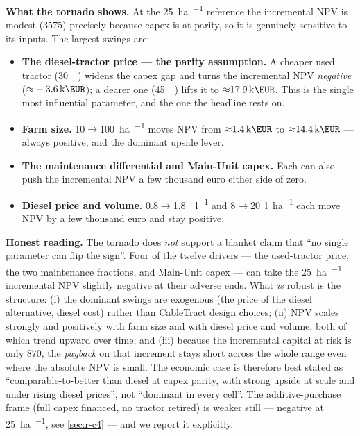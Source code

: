 \documentclass[11pt,a4paper]{article}
\begin{document}
\textbf{What the tornado shows.} At the \SI{25}{\hectare\per\year} reference the incremental NPV is modest (\SI{+3575}{\EUR}) precisely because capex is at parity, so it is genuinely sensitive to its inputs. The largest swings are:
\begin{itemize}[leftmargin=1.6em,itemsep=0.15em]
    \item \textbf{The diesel-tractor price --- the parity assumption.} A cheaper used tractor (\SI{30}{\kilo\EUR}) widens the capex gap and turns the incremental NPV \emph{negative} (${\approx}\SI{-3.6}{\kilo\EUR}$); a dearer one (\SI{45}{\kilo\EUR}) lifts it to ${\approx}\SI{+17.9}{\kilo\EUR}$. This is the single most influential parameter, and the one the headline rests on.
    \item \textbf{Farm size.} 10$\to$\SI{100}{\hectare\per\year} moves NPV from ${\approx}\SI{+1.4}{\kilo\EUR}$ to ${\approx}\SI{+14.4}{\kilo\EUR}$ --- always positive, and the dominant upside lever.
    \item \textbf{The maintenance differential and Main-Unit capex.} Each can also push the incremental NPV a few thousand euro either side of zero.
    \item \textbf{Diesel price and volume.} 0.8$\to$\SI{1.8}{\EUR\per\litre} and 8$\to$\SI{20}{\litre\per\hectare} each move NPV by a few thousand euro and stay positive.
\end{itemize}

\textbf{Honest reading.} The tornado does \emph{not} support a blanket claim that ``no single parameter can flip the sign''. Four of the twelve drivers --- the used-tractor price, the two maintenance fractions, and Main-Unit capex --- can take the \SI{25}{\hectare\per\year} incremental NPV slightly negative at their adverse ends. What \emph{is} robust is the structure: (i) the dominant swings are exogenous (the price of the diesel alternative, diesel cost) rather than CableTract design choices; (ii) NPV scales strongly and positively with farm size and with diesel price and volume, both of which trend upward over time; and (iii) because the incremental capital at risk is only \SI{870}{\EUR}, the \emph{payback} on that increment stays short across the whole range even where the absolute NPV is small. The economic case is therefore best stated as ``comparable-to-better than diesel at capex parity, with strong upside at scale and under rising diesel prices'', not ``dominant in every cell''. The additive-purchase frame (full capex financed, no tractor retired) is weaker still --- negative at \SI{25}{\hectare\per\year}, see \cref{sec:r-c4} --- and we report it explicitly.
\end{document}
